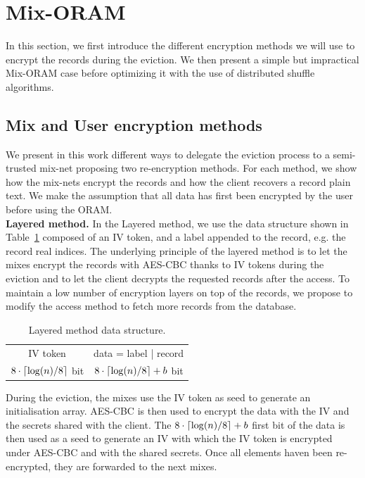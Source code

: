 \documentclass[USenglish,oneside,twocolumn]{article}
\DeclarePairedDelimiter{\ceil}{\lceil}{\rceil}
\begin{document}
\section{Mix-ORAM}\label{Mix-ORAM}
In this section, we first introduce the different encryption methods we will use to encrypt the records during the eviction. We then present a simple but impractical Mix-ORAM case before optimizing it with the use of distributed shuffle algorithms. 
%
\subsection{Mix and User encryption methods}\label{Enc}
We present in this work different ways to delegate the eviction process to a semi-trusted mix-net proposing two re-encryption methods. For each method, we show how the mix-nets encrypt the records and how the client recovers a record plain text.
We make the assumption that all data has first been encrypted by the user before using the ORAM. \\

\textbf{Layered method.} In the Layered method, we use the data structure shown in Table~\ref{ldata} composed of an IV token, and a label appended to the record, e.g. the record real indices. The underlying principle of the layered method is to let the mixes encrypt the records with AES-CBC thanks to IV tokens during the eviction and to let the client decrypts the requested records after the access. To maintain a low number of encryption layers on top of the records, we propose to modify the access method to fetch more records from the database.

\begin{table}[H]
\begin{minipage}[t][][b]{.475\textwidth}
\vspace{0pt}
\centering
\begin{tabular}{|c|c|}
IV token  &  data = label | record  \\
$8\cdot\ceil{\log(n)/8}$ bit  &  $8\cdot\ceil{\log(n)/8}+b$ bit   \\
\end{tabular}
\centering
\caption{Layered method data structure.}
\label{ldata}
\end{minipage}
\end{table}

During the eviction, the mixes use the IV token as seed to generate an initialisation array. AES-CBC is then used to encrypt the data with the IV and the secrets shared with the client. The $8\cdot\ceil{\log(n)/8}+b$ first bit of the data is then used as a seed to generate an IV with which the IV token is encrypted under AES-CBC and with the shared secrets. Once all elements haven been re-encrypted, they are forwarded to the next mixes.
\end{document}
